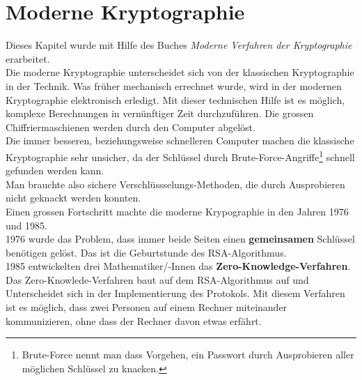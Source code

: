 \newpage
\section{Moderne Kryptographie}
Dieses Kapitel wurde mit Hilfe des Buches \textit{Moderne Verfahren der Kryptographie} erarbeitet.\\[2ex]
Die moderne Kryptographie unterscheidet sich von der klassischen Kryptographie in der Technik. Was früher mechanisch errechnet wurde, wird in der modernen Kryptographie elektronisch erledigt. Mit dieser technischen Hilfe ist es möglich, komplexe Berechnungen in vernünftiger Zeit durchzuführen. Die grossen Chiffriermaschienen werden durch den Computer abgelöst.\\
Die immer besseren, beziehungsweise schnelleren Computer machen die klassische Kryptographie sehr unsicher, da der Schlüssel durch Brute-Force-Angriffe\footnote{Brute-Force nennt man dass Vorgehen, ein Passwort durch Ausprobieren aller möglichen Schlüssel zu knacken.} schnell gefunden werden kann.\\
Man brauchte also sichere Verschlüssselungs-Methoden, die durch Ausprobieren nicht geknackt werden konnten.\\
Einen grossen Fortschritt machte die moderne Krypographie in den Jahren 1976 und 1985.\\
1976 wurde das Problem, dass immer beide Seiten einen \textbf{gemeinsamen} Schlüssel benötigen gelöst. Das ist die Geburtstunde des RSA-Algorithmus.\\
1985 entwickelten drei Mathematiker/-Innen das \textbf{Zero-Knowledge-Verfahren}. \cite{} Das Zero-Knowlede-Verfahren baut auf dem RSA-Algorithmus auf und Unterscheidet sich in der Implementierung des Protokols. Mit diesem Verfahren ist es möglich, dass zwei Personen auf einem Rechner miteinander kommunizieren, ohne dass der Rechner davon etwas erfährt.
%

